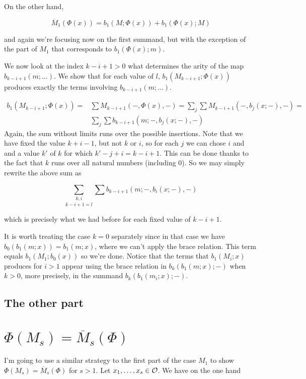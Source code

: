 \documentclass[twoside]{article}
\begin{document}
On the other hand, 

$$\overline{M}_1(\Phi(x))=b_1(M;\Phi(x))+b_1(\Phi(x);M)$$

and again we're focusing now on the first summand, but with the exception of the part of $M_1$ that corresponds to $b_1(\Phi(x);m)$. 

We now look at the index $k-i+1> 0$ what determines the arity of the map $b_{k-i+1}(m;\dots)$. We show that for each value of $l$, $b_1(M_{k-i+1};\Phi(x))$ produces exactly the terms involving $b_{k-i+1}(m;\dots)$. 

\begin{align*}
b_1(M_{k-i+1};\Phi(x))=&\sum M_{k-i+1}(-,\Phi(x),-)=\sum_j\sum M_{k-i+1}(-,b_j(x;-),-)=\\
&\sum_j\sum b_{k-i+1}(m;-,b_j(x;-),-)
\end{align*}
Again, the sum without limits runs over the possible insertions. Note that we have fixed the value $k+i-1$, but not $k$ or $i$, so for each $j$ we can chose $i$ and and a value $k'$ of $k$ for which $k'-j+i=k-i+1$. This can be done thanks to the fact that $k$ runs over all natural numbers (including 0). So we may simply rewrite the above sum as

$$\underset{k-i+1=l}{\sum_{k,i}}\sum b_{k-i+1}(m;-,b_i(x;-),-)$$

which is precisely what we had before for each fixed value of $k-i+1$. %

It is worth treating the case $k=0$ separately since in that case we have $b_0(b_1(m;x))=b_1(m;x)$, where we can't apply the brace relation. This term equals $b_1(M_1;b_0(x))$ so we're done. Notice that the terms that $b_1(M_i;x)$ produces for $i>1$ appear using the brace relation in $b_k(b_1(m;x);-)$ when $k>0$, more precisely, in the summand $b_k(b_1(m_i;x);-)$. 

\subsection{The other part}

\section{$\Phi(M_s)=\overline{M}_s(\Phi)$}

I'm going to use a similar strategy to the first part of the case $M_1$ to show $\Phi(M_s)=\overline{M}_s(\Phi)$ for $s>1$. Let $x_1,\dots, x_s\in{\mathcal O}$. We have on the one hand
\end{document}
